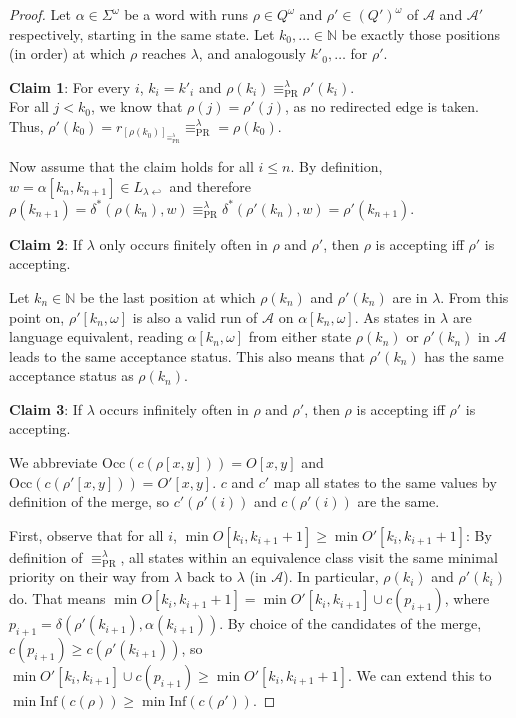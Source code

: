 \begin{proof} 
	Let $\alpha \in \Sigma^\omega$ be a word with runs $\rho \in Q^\omega$ and $\rho' \in (Q')^\omega$ of $\mathcal{A}$ and $\mathcal{A}'$ respectively, starting in the same state. Let $k_0, \dots \in \mathbb{N}$ be exactly those positions (in order) at which $\rho$ reaches $\lambda$, and analogously $k'_0, \dots$ for $\rho'$. 

	\vspace{5pt}
	\textbf{Claim 1}: For every $i$, $k_i = k'_i$ and $\rho(k_i) \equiv_\text{PR}^\lambda \rho'(k_i)$. \\
	For all $j < k_0$, we know that $\rho(j) = \rho'(j)$, as no redirected edge is taken. Thus, $\rho'(k_0) = r_{[\rho(k_0)]_{\equiv_\text{PR}^\lambda}} \equiv_\text{PR}^\lambda = \rho(k_0)$.
	
	Now assume that the claim holds for all $i \leq n$. By definition, $w = \alpha[k_n, k_{n+1}] \in L_{\lambda \hookleftarrow}$ and therefore $\rho(k_{n+1}) = \delta^*(\rho(k_n), w) \equiv_\text{PR}^\lambda \delta^*(\rho'(k_n), w) = \rho'(k_{n+1})$.
	
	\vspace{5pt}
	\textbf{Claim 2}: If $\lambda$ only occurs finitely often in $\rho$ and $\rho'$, then $\rho$ is accepting iff $\rho'$ is accepting. 
	
	Let $k_n \in \mathbb{N}$ be the last position at which $\rho(k_n)$ and $\rho'(k_n)$ are in $\lambda$. From this point on, $\rho'[k_n, \omega]$ is also a valid run of $\mathcal{A}$ on $\alpha[k_n, \omega]$. As states in $\lambda$ are language equivalent, reading $\alpha[k_n, \omega]$ from either state $\rho(k_n)$ or $\rho'(k_n)$ in $\mathcal{A}$ leads to the same acceptance status. This also means that $\rho'(k_n)$ has the same acceptance status as $\rho(k_n)$.
	
	\vspace{5pt}
	\textbf{Claim 3}: If $\lambda$ occurs infinitely often in $\rho$ and $\rho'$, then $\rho$ is accepting iff $\rho'$ is accepting. 
	
	We abbreviate $\text{Occ}(c(\rho[x, y])) = O[x, y]$ and $\text{Occ}(c(\rho'[x, y])) = O'[x, y]$. $c$ and $c'$ map all states to the same values by definition of the merge, so $c'(\rho'(i))$ and $c(\rho'(i))$ are the same.
	
	First, observe that for all $i$, $\min O[k_i, k_{i+1} + 1] \geq \min O'[k_i, k_{i+1} + 1]$: By definition of $\equiv_\text{PR}^\lambda$, all states within an equivalence class visit the same minimal priority on their way from $\lambda$ back to $\lambda$ (in $\mathcal{A}$). In particular, $\rho(k_i)$ and $\rho'(k_i)$ do. That means $\min O[k_i, k_{i+1} + 1] = \min O'[k_i, k_{i+1}] \cup c(p_{i+1})$, where $p_{i+1} = \delta(\rho'(k_{i+1}), \alpha(k_{i+1}))$. By choice of the candidates of the merge, $c(p_{i+1}) \geq c(\rho'(k_{i+1}))$, so $\min O'[k_i, k_{i+1}] \cup c(p_{i+1}) \geq \min O'[k_i, k_{i+1} + 1]$. We can extend this to $\min \text{Inf}(c(\rho)) \geq \min \text{Inf}(c(\rho'))$.
	

\end{proof}
